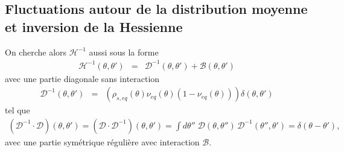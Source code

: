%
%
%
%
%
%
%

 \subsection{Fluctuations autour de la distribution moyenne et inversion de la Hessienne}

 On cherche alors \(\mathcal{H}^{-1} \) aussi sous la forme
\begin{eqnarray}
	\mathcal{H}^{-1}(\theta, \theta') & = & \mathcal{D}^{-1}(\theta, \theta') + \mathcal{B}(\theta, \theta')
	\label{chap:fluctu:eq:hessienner.inv.1}
\end{eqnarray}
avec une partie diagonale sans interaction
\begin{eqnarray}
	\mathcal{D}^{-1}(\theta, \theta') & = & (\rho_{\! s , eq}(\theta)  \nu_{\! eq}(\theta)(1 -\nu_{\! eq}(\theta)))  \delta(\theta, \theta')
	 \label{chap:fluctu:eq:irreg.inv}
\end{eqnarray}
tel que
\begin{eqnarray}
    (\mathcal{D}^{-1} \cdot  \mathcal{D})(\theta, \theta')  = (\mathcal{D}\cdot  \mathcal{D}^{-1})(\theta, \theta') =  \int d\theta'' \; \mathcal{D}(\theta, \theta'') \, \mathcal{D}^{-1}(\theta'', \theta') = \delta(\theta - \theta'),
    \label{chap:fluctu:eq:irreg.prod.inv}
\end{eqnarray}
avec une partie symétrique régulière avec interaction $\mathcal{B}$.

